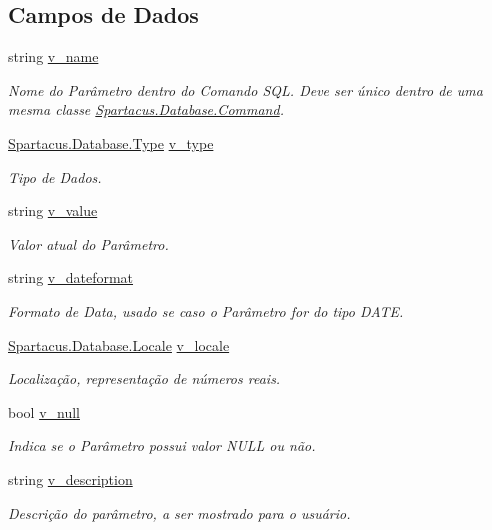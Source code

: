 \subsection*{Campos de Dados}
\begin{DoxyCompactItemize}
\item 
string \hyperlink{classSpartacus_1_1Database_1_1Parameter_a5bea1044f316cf4507de807026b1599a}{v\+\_\+name}
\begin{DoxyCompactList}\small\item\em Nome do Parâmetro dentro do Comando S\+Q\+L. Deve ser único dentro de uma mesma classe \hyperlink{classSpartacus_1_1Database_1_1Command}{Spartacus.\+Database.\+Command}. \end{DoxyCompactList}\item 
\hyperlink{namespaceSpartacus_1_1Database_a9d4c2be7c9bc257b8d34c84b43e5ec32}{Spartacus.\+Database.\+Type} \hyperlink{classSpartacus_1_1Database_1_1Parameter_a0185e9a5eb61471aed6a5fe31f7fdac6}{v\+\_\+type}
\begin{DoxyCompactList}\small\item\em Tipo de Dados. \end{DoxyCompactList}\item 
string \hyperlink{classSpartacus_1_1Database_1_1Parameter_a124939a3bf560bd654e83b54f94c522b}{v\+\_\+value}
\begin{DoxyCompactList}\small\item\em Valor atual do Parâmetro. \end{DoxyCompactList}\item 
string \hyperlink{classSpartacus_1_1Database_1_1Parameter_a55aba864768ac148a7153eb51b7cf845}{v\+\_\+dateformat}
\begin{DoxyCompactList}\small\item\em Formato de Data, usado se caso o Parâmetro for do tipo D\+A\+T\+E. \end{DoxyCompactList}\item 
\hyperlink{namespaceSpartacus_1_1Database_a5c77dce887cad55e7ea67f0f98a7d71f}{Spartacus.\+Database.\+Locale} \hyperlink{classSpartacus_1_1Database_1_1Parameter_abc543efca34bb719b603e7157202b37a}{v\+\_\+locale}
\begin{DoxyCompactList}\small\item\em Localização, representação de números reais. \end{DoxyCompactList}\item 
bool \hyperlink{classSpartacus_1_1Database_1_1Parameter_af422ee9e94e89ad0994b6ac2de2833ba}{v\+\_\+null}
\begin{DoxyCompactList}\small\item\em Indica se o Parâmetro possui valor N\+U\+L\+L ou não. \end{DoxyCompactList}\item 
string \hyperlink{classSpartacus_1_1Database_1_1Parameter_a94ea1be55d0301fa86f274a52206c214}{v\+\_\+description}
\begin{DoxyCompactList}\small\item\em Descrição do parâmetro, a ser mostrado para o usuário. \end{DoxyCompactList}\end{DoxyCompactItemize}


